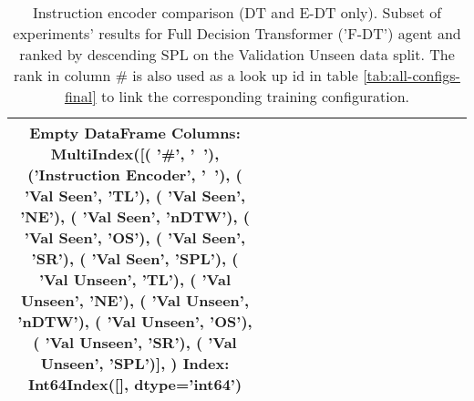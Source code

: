 \begin{table}
\centering
\caption{\label{tab:f_dt_instruction_encoding}Instruction encoder comparison (DT and E-DT only). Subset of experiments' results for Full Decision Transformer ('F-DT') agent and ranked by descending SPL on the Validation Unseen data split. The rank in column \# is also used as a look up id in table \ref{tab:all-configs-final} to link the corresponding training configuration.}
\begin{tabular}{@{\hskip3pt}c@{\hskip3pt}c@{\hskip3pt}c@{\hskip3pt}c@{\hskip3pt}c@{\hskip3pt}c@{\hskip3pt}c@{\hskip3pt}c@{\hskip3pt}c@{\hskip3pt}c@{\hskip3pt}c@{\hskip3pt}c@{\hskip3pt}c@{\hskip3pt}c@{\hskip3pt}c}
\toprule
Empty DataFrame
Columns: MultiIndex([(                 '\textbf{\#}',    '\textbf{~}'),
            ('\textbf{Instruction Encoder}',    '\textbf{~}'),
            (           '\textbf{Val Seen}',   '\textbf{TL}'),
            (           '\textbf{Val Seen}',   '\textbf{NE}'),
            (           '\textbf{Val Seen}', '\textbf{nDTW}'),
            (           '\textbf{Val Seen}',   '\textbf{OS}'),
            (           '\textbf{Val Seen}',   '\textbf{SR}'),
            (           '\textbf{Val Seen}',  '\textbf{SPL}'),
            (         '\textbf{Val Unseen}',   '\textbf{TL}'),
            (         '\textbf{Val Unseen}',   '\textbf{NE}'),
            (         '\textbf{Val Unseen}', '\textbf{nDTW}'),
            (         '\textbf{Val Unseen}',   '\textbf{OS}'),
            (         '\textbf{Val Unseen}',   '\textbf{SR}'),
            (         '\textbf{Val Unseen}',  '\textbf{SPL}')],
           )
Index: Int64Index([], dtype='int64') \\
\bottomrule
\end{tabular}
\end{table}
